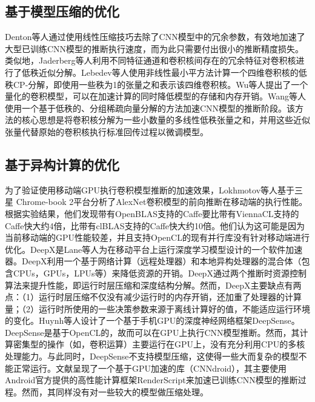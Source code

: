 \subsection{基于模型压缩的优化}
Denton等人\cite{denton2014exploiting}通过使用线性压缩技巧去除了CNN模型中的冗余参数，有效地加速了大型已训练CNN模型的推断执行速度，而为此只需要付出很小的推断精度损失。类似地，Jaderberg等人\cite{jaderberg2014speeding}利用不同特征通道和卷积核间存在的冗余特征对卷积核进行了低秩近似分解。Lebedev等人\cite{lebedev2014speeding}使用非线性最小平方法计算一个四维卷积核的低秩CP-分解，即使用一些秩为1的张量之和表示该四维卷积核。Wu等人\cite{wu2016quantized}提出了一个量化的卷积模型，可以在加速计算的同时降低模型的存储和内存开销。Wang等人\cite{wang2016accelerating}使用一个基于低秩的、分组稀疏向量分解的方法加速CNN模型的推断阶段。该方法的核心思想是将卷积核分解为一些小数量的多线性低秩张量之和，并用这些近似张量代替原始的卷积核执行标准回传过程以微调模型。
\subsection{基于异构计算的优化}
为了验证使用移动端GPU执行卷积模型推断的加速效果，Lokhmotov等人\cite{lokhmotov2016optimizing}基于三星 Chrome-book 2平台分析了AlexNet\cite{krizhevsky2012imagenet}卷积模型的前向推断在移动端的执行性能。根据实验结果，他们发现带有OpenBLAS\cite{xianyi2012openblas}支持的Caffe\cite{jia2014caffe}要比带有ViennaCL\cite{rupp2010viennacl}支持的Caffe快大约4倍，比带有clBLAS\cite{nugteren2017clblast}支持的Caffe快大约10倍。他们认为这可能是因为当前移动端的GPU性能较差，并且支持OpenCL\cite{stone2010opencl}的现有并行库没有针对移动端进行优化。DeepX是Lane等人\cite{lane2016deepx}为在移动平台上运行深度学习模型设计的一个软件加速器。DeepX利用一个基于网络计算（远程处理器）和本地异构处理器的混合体（包含CPUs，GPUs，LPUs等）来降低资源的开销。DeepX通过两个推断时资源控制算法来提升性能，即运行时层压缩和深度结构分解。然而，DeepX主要缺点有两点：（1）运行时层压缩不仅没有减少运行时的内存开销，还加重了处理器的计算量；（2）运行时所使用的一些决策参数来源于离线计算好的值，不能适应运行环境的变化。Huynh等人\cite{huynh2016deepsense}设计了一个基于手机GPU的深度神经网络框架DeepSense。DeepSense是基于OpenCL的，故而可以在GPU上执行CNN模型推断。然而，其计算密集型的操作（如，卷积运算）主要运行在GPU上，没有充分利用CPU的多核处理能力。与此同时，DeepSense不支持模型压缩，这使得一些大而复杂的模型不能正常运行。文献\cite{latifi2016cnndroid}呈现了一个基于GPU加速的库（CNNdroid），其主要使用Android官方提供的高性能计算框架RenderScript\cite{guihot2012renderscript}来加速已训练CNN模型的推断过程。然而，其同样没有对一些较大的模型做压缩处理。
